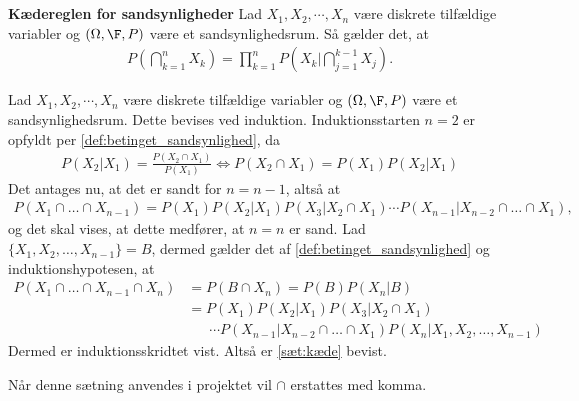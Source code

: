 \section{}\label{bilag:kædereglen}
\begin{minipage}\textwidth
\begin{thmx} \textbf{Kædereglen for sandsynligheder} \label{sæt:kæde}%
\newline
Lad $X_1, X_2, \cdots, X_n$ være diskrete tilfældige variabler og $(\Omega, \F, P)$ være et sandsynlighedsrum. Så gælder det, at 
\begin{align*}
    P\left(\bigcap_{k=1}^n X_k\right)=\prod_{k=1}^n P\left(X_k\bigg|\bigcap_{j=1}^{k-1} X_j\right).
\end{align*}
\end{thmx}
\end{minipage}

\begin{bev} \textbf{} %
\newline
Lad $X_1, X_2, \cdots, X_n$ være diskrete tilfældige variabler og $(\Omega, \F, P)$ være et sandsynlighedsrum.
Dette bevises ved induktion. Induktionsstarten $n=2$ er opfyldt per \autoref{def:betinget_sandsynlighed}, da
\begin{align*}
    P(X_2 | X_1) = \frac{P(X_2 \cap X_1)}{P(X_1)} \Leftrightarrow P(X_2 \cap X_1) = P(X_1)P(X_2 | X_1)
\end{align*}
Det antages nu, at det er sandt for $n = n-1$, altså at 
\begin{align*}
    P(X_1 \cap \dots \cap X_{n-1}) = P(X_1)P(X_2|X_1)P(X_3|X_2 \cap X_1) \cdots P(X_{n-1} | X_{n-2} \cap \dots \cap X_1),
\end{align*}
og det skal vises, at dette medfører, at $n=n$ er sand. Lad $\{X_1, X_2, \dots, X_{n-1}\} = B$, dermed gælder det af \autoref{def:betinget_sandsynlighed} og induktionshypotesen, at
\begin{align*}
    P(X_1 \cap \dots \cap X_{n-1} \cap X_n) &= P(B \cap X_n) = P(B)P(X_n | B)\\
    &= P(X_1)P(X_2|X_1)P(X_3|X_2 \cap X_1) \\
    &\phantom{= \ } \cdots P(X_{n-1} | X_{n-2} \cap \dots \cap X_1)P(X_n | X_1, X_2, \dots, X_{n-1})
\end{align*}
Dermed er induktionsskridtet vist. Altså er \autoref{sæt:kæde} bevist.
\end{bev}
Når denne sætning anvendes i projektet vil $\cap$ erstattes med komma.